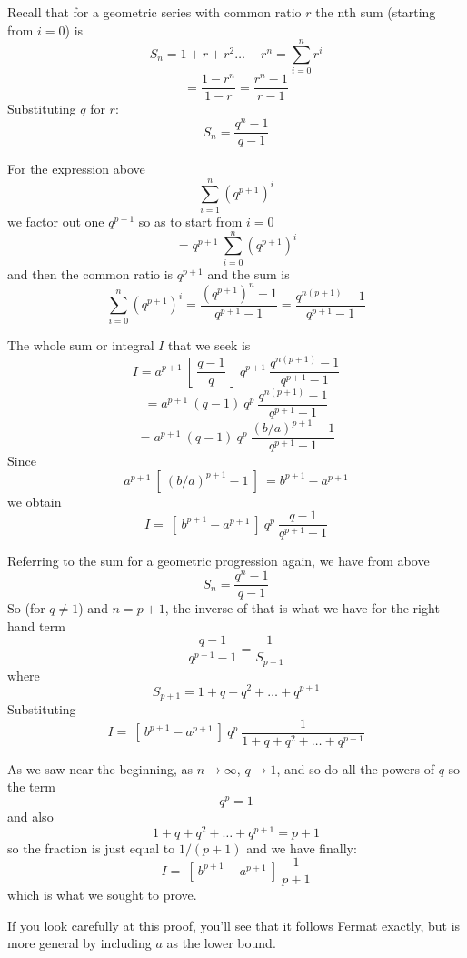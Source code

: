 \documentclass[11pt, oneside]{article}   	%
\begin{document}
Recall that for a geometric series with common ratio $r$ the nth sum (starting from $i=0$) is
\[ S_n = 1 + r + r^2 \dots + r^n =  \sum_{i=0}^n r^i \]
\[ = \frac{1 - r^n}{1 - r} = \frac{r^n - 1}{r - 1}  \]
Substituting $q$ for $r$:
\[ S_n = \frac{q^n - 1}{q - 1}  \]

For the expression above
\[  \sum_{i=1}^n  (q^{p+1})^i  \]
we factor out one $q^{p+1}$ so as to start from $i=0$
\[ = q^{p+1} \ \sum_{i=0}^n  (q^{p+1})^i  \]
and then the common ratio is $q^{p+1}$ and the sum is
\[ \sum_{i=0}^n  (q^{p+1})^i = \frac{(q^{p+1})^{n} - 1}{q^{p+1} - 1} = \frac{q^{n(p+1)} - 1}{q^{p+1} - 1} \]

The whole sum or integral $I$ that we seek is
\[ I = a^{p+1} \  [ \ \frac{q-1}{q} \ ] \  q^{p+1} \ \frac{q^{n(p+1)} - 1}{q^{p+1} - 1} \]
\[ = a^{p+1} \ (q-1) \ q^p  \ \frac{q^{n(p+1)} - 1}{q^{p+1} - 1} \]
\[ = a^{p+1} \  (q-1) \ q^p  \ \frac{(b/a)^{p+1} - 1}{q^{p+1} - 1} \]
Since
\[ a^{p+1} \ [ \ (b/a)^{p+1} - 1 \ ] \ = b^{p+1} - a^{p+1} \]
we obtain
\[ I = \ [ \ b^{p+1} - a^{p+1} \ ] \ q^p \ \frac{q-1}{q^{p+1} - 1} \]

Referring to the sum for a geometric progression again, we have from above 
\[ S_n = \frac{q^n - 1}{q - 1}  \]
So (for $q \ne 1$) and $n=p+1$, the inverse of that is what we have for the right-hand term
\[ \frac{q-1}{q^{p+1} - 1} = \frac{1}{S_{p+1} }  \]
where
\[ S_{p+1} = 1 + q + q^2 + \dots + q^{p+1} \]
Substituting
\[ I = \ [ \ b^{p+1} - a^{p+1} \ ] \ q^p \ \frac{1}{1 + q + q^2 + \dots + q^{p+1}}  \]

As we saw near the beginning, as $n \rightarrow \infty$, $q \rightarrow 1$, and so do all the powers of $q$ so the term
\[ q^p = 1 \]
and also
\[ 1 + q + q^2 + \dots + q^{p+1} = p + 1 \]
so the fraction is just equal to $1/(p+1)$ and we have finally:
\[ I = \ [ \ b^{p+1} - a^{p+1} \ ] \ \frac{1}{p + 1} \]
which is what we sought to prove.

If you look carefully at this proof, you'll see that it follows Fermat exactly, but is more general by including $a$ as the lower bound.
\end{document}
